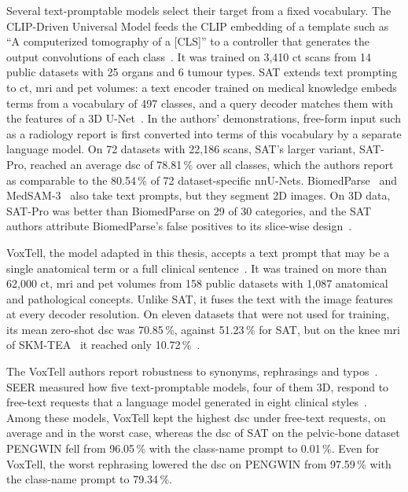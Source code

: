 Several text-promptable models select their target from a fixed vocabulary.
The CLIP-Driven Universal Model feeds the CLIP embedding of a template such as ``A computerized tomography of a [CLS]'' to a controller that generates the output convolutions of each class~\cite{Liu_2023}.
It was trained on 3{,}410 \gls{ct} scans from 14 public datasets with 25 organs and 6 tumour types.
SAT extends text prompting to \gls{ct}, \gls{mri} and \gls{pet} volumes: a text encoder trained on medical knowledge embeds terms from a vocabulary of 497 classes, and a query decoder matches them with the features of a 3D U-Net~\cite{zhao2025sat}.
In the authors' demonstrations, free-form input such as a radiology report is first converted into terms of this vocabulary by a separate language model.
On 72 datasets with 22{,}186 scans, SAT's larger variant, SAT-Pro, reached an average \gls{dsc} of 78.81\,\% over all classes, which the authors report as comparable to the 80.54\,\% of 72 dataset-specific nnU-Nets.
BiomedParse~\cite{zhao2025foundation-9de} and MedSAM-3~\cite{liu2026medsam3delvingsegmentmedical} also take text prompts, but they segment 2D images.
On 3D data, SAT-Pro was better than BiomedParse on 29 of 30 categories, and the SAT authors attribute BiomedParse's false positives to its slice-wise design~\cite{zhao2025sat}.

VoxTell, the model adapted in this thesis, accepts a text prompt that may be a single anatomical term or a full clinical sentence~\cite{rokuss2025voxtellfreetextpromptableuniversal}.
It was trained on more than 62{,}000 \gls{ct}, \gls{mri} and \gls{pet} volumes from 158 public datasets with 1{,}087 anatomical and pathological concepts.
Unlike SAT, it fuses the text with the image features at every decoder resolution.
On eleven datasets that were not used for training, its mean zero-shot \gls{dsc} was 70.85\,\%, against 51.23\,\% for SAT, but on the knee \gls{mri} of SKM-TEA~\cite{desai2021skmtea} it reached only 10.72\,\%~\cite[Suppl.~Table~9]{rokuss2025voxtellfreetextpromptableuniversal}.

The VoxTell authors report robustness to synonyms, rephrasings and typos~\cite{rokuss2025voxtellfreetextpromptableuniversal}.
SEER measured how five text-promptable models, four of them 3D, respond to free-text requests that a language model generated in eight clinical styles~\cite{zhang2026seer}.
Among these models, VoxTell kept the highest \gls{dsc} under free-text requests, on average and in the worst case, whereas the \gls{dsc} of SAT on the pelvic-bone dataset PENGWIN fell from 96.05\,\% with the class-name prompt to 0.01\,\%.
Even for VoxTell, the worst rephrasing lowered the \gls{dsc} on PENGWIN from 97.59\,\% with the class-name prompt to 79.34\,\%.
